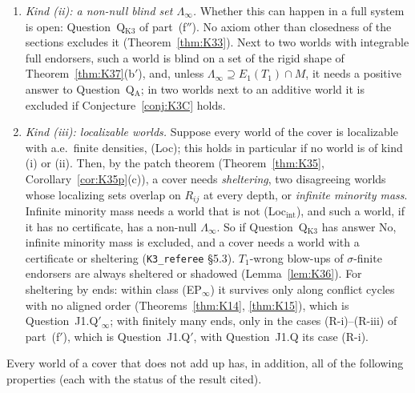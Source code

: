\documentclass[11pt]{article}
\theoremstyle{definition}
\theoremstyle{remark}
\newcommand{\src}[1]{\texttt{#1}}
\begin{document}
\begin{enumerate}[leftmargin=*,label=(\arabic*)]
\item \emph{Kind (ii): a non-null blind set $\Lambda_\infty$.} Whether this can happen in a full system is open: Question~Q$_{\mathrm{K3}}$ of part~(f$''$). No axiom other than closedness of the sections excludes it (Theorem~\ref{thm:K33}). Next to two worlds with integrable full endorsers, such a world is blind on a set of the rigid shape of Theorem~\ref{thm:K37}(b$'$), and, unless $\Lambda_\infty\supseteq E_1(T_1)\cap M$, it needs a positive answer to Question~Q$_{\mathrm A}$; in two worlds next to an additive world it is excluded if Conjecture~\ref{conj:K3C} holds.
\item \emph{Kind (iii): localizable worlds.} Suppose every world of the cover is localizable with a.e.\ finite densities, (Loc); this holds in particular if no world is of kind (i) or (ii). Then, by the patch theorem (Theorem~\ref{thm:K35}, Corollary~\ref{cor:K35p}(c)), a cover needs \emph{sheltering}, two disagreeing worlds whose localizing sets overlap on $R_{ij}$ at every depth, or \emph{infinite minority mass}. Infinite minority mass needs a world that is not (Loc$_{\mathrm{int}}$), and such a world, if it has no certificate, has a non-null $\Lambda_\infty$. So if Question~Q$_{\mathrm{K3}}$ has answer No, infinite minority mass is excluded, and a cover needs a world with a certificate or sheltering (\src{K3\_referee} \S5.3). $T_1$-wrong blow-ups of $\sigma$-finite endorsers are always sheltered or shadowed (Lemma~\ref{lem:K36}). For sheltering by ends: within class (EP$_\infty$) it survives only along conflict cycles with no aligned order (Theorems~\ref{thm:K14}, \ref{thm:K15}), which is Question~J1.Q$'_\infty$; with finitely many ends, only in the cases (R-i)--(R-iii) of part~(f$'$), which is Question~J1.Q$'$, with Question~J1.Q its case (R-i).
\end{enumerate}
Every world of a cover that does not add up has, in addition, all of the following properties (each with the status of the result cited).
\end{document}
